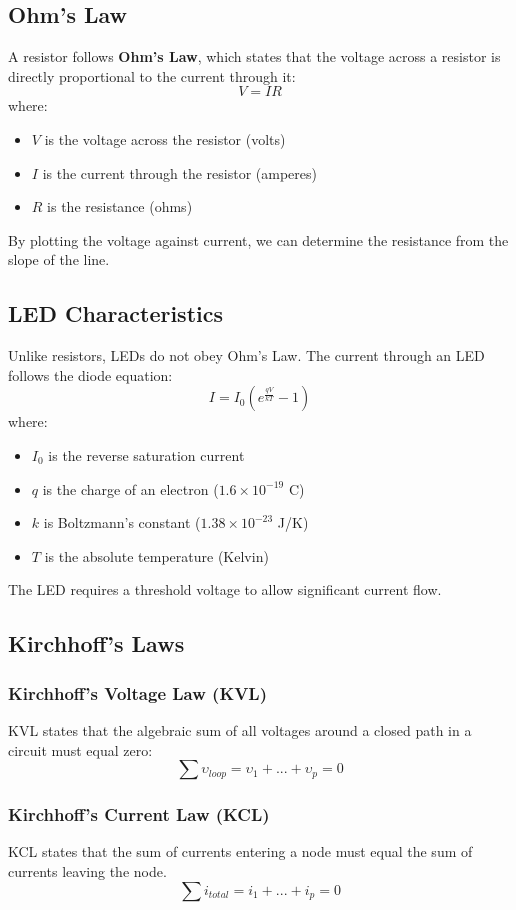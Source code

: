 \documentclass[12pt]{article}
\begin{document}
\subsection{Ohm’s Law}
A resistor follows \textbf{Ohm’s Law}, which states that the voltage across a resistor is directly proportional to the current through it:
\[ V = IR \]
where:
\begin{itemize}
	\item \( V \) is the voltage across the resistor (volts)
	\item \( I \) is the current through the resistor (amperes)
	\item \( R \) is the resistance (ohms)
\end{itemize}
By plotting the voltage against current, we can determine the resistance from the slope of the line.

\subsection{LED Characteristics}
Unlike resistors, LEDs do not obey Ohm’s Law. The current through an LED follows the diode equation:
\[ I = I_0 \left( e^{\frac{qV}{kT}} - 1 \right) \]
where:
\begin{itemize}
	\item \( I_0 \) is the reverse saturation current
	\item \( q \) is the charge of an electron (\(1.6 \times 10^{-19}\) C)
	\item \( k \) is Boltzmann's constant (\(1.38 \times 10^{-23}\) J/K)
	\item \( T \) is the absolute temperature (Kelvin)
\end{itemize}
The LED requires a threshold voltage to allow significant current flow.

\subsection{Kirchhoff’s Laws}
\subsubsection{Kirchhoff’s Voltage Law (KVL)}
KVL states that the algebraic sum of all
voltages around a closed path in a circuit  must equal zero:
\[ \sum \upsilon_{loop} = \upsilon_1 + ... + \upsilon_p = 0 \]
\subsubsection{Kirchhoff’s Current Law (KCL)}
KCL states that the sum of currents entering a node must equal the sum of currents leaving the node.
\[
	\sum i_{total} = i_1 + ... + i_p = 0
\]
\end{document}
